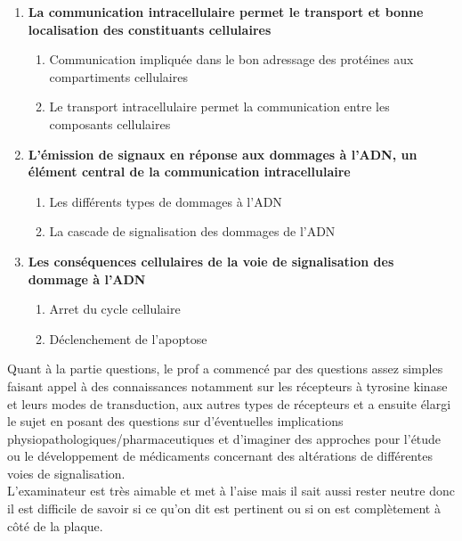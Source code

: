 \begin{enumerate}[label=\textcolor{red}{\bf \Roman*.}]
    \item {\bf\color{red} La communication intracellulaire permet le transport et bonne localisation des constituants cellulaires}
    \begin{enumerate}[label=\alph*)]
        \item Communication impliquée dans le bon adressage des protéines aux compartiments cellulaires
        \item Le transport intracellulaire permet la communication entre les composants cellulaires
    \end{enumerate}
    \item {\bf\color{red}L’émission de signaux en réponse aux dommages à l’ADN, un élément central de la communication intracellulaire}
    \begin{enumerate}[label=\alph*)]
        \item Les différents types de dommages à l’ADN
        \item La cascade de signalisation des dommages de l’ADN
    \end{enumerate}
    \item {\bf\color{red}Les conséquences cellulaires de la voie de signalisation des dommage à l’ADN}
    \begin{enumerate}[label=\alph*)]
        \item Arret du cycle cellulaire
        \item Déclenchement de l’apoptose
    \end{enumerate}
\end{enumerate}

Quant à la partie questions, le prof a commencé par des questions assez simples faisant appel à des connaissances notamment sur les récepteurs à tyrosine kinase et leurs modes de transduction, aux autres types de récepteurs et a ensuite élargi le sujet en posant des questions sur d’éventuelles implications physiopathologiques/pharmaceutiques et d’imaginer des approches pour l’étude ou le développement de médicaments concernant des altérations de différentes voies de signalisation.\\
L’examinateur est très aimable et met à l’aise mais il sait aussi rester neutre donc il est difficile de savoir si ce qu’on dit est pertinent ou si on est complètement à côté de la plaque.\\



